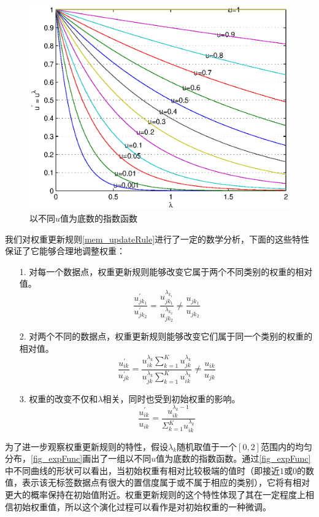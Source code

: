 \begin{figure}[h]
   \centering
   \includegraphics[width=4.5in]{figures/expfunc}
\caption{以不同\(u\)值为底数的指数函数}
\label{fig_expFunc}
\end{figure}


我们对权重更新规则\autoref{mem_updateRule}进行了一定的数学分析，下面的这些特性保证了它能够合理地调整权重：
\begin{enumerate}
\item[1.]对每一个数据点，权重更新规则能够改变它属于两个不同类别的权重的相对值。
\\ \[ \frac{u_{jk_{1}}^{'}}{u_{jk_{2}}^{'}}=\frac{u_{jk_{1}}^{\lambda_{k_{1}}}}{u_{jk_{2}}^{\lambda_{k_{2}}}} \neq \frac{u_{jk_{1}}}{u_{jk_{2}}} \]
%
\item[2.]对两个不同的数据点，权重更新规则能够改变它们属于同一个类别的权重的相对值。
\\ \[ \frac{u_{ik}^{'}}{u_{jk}^{'}}=\frac{u_{ik}^{\lambda_{k}} \sum_{k=1}^{K}u_{jk}^{\lambda_{k}}}{u_{jk}^{\lambda_{k}} \sum_{k=1}^{K}u_{ik}^{\lambda_{k}}} \neq \frac{u_{ik}}{u_{jk}} \]
%
\item[3.]权重的改变不仅和\(\lambda\)相关，同时也受到初始权重的影响。
\\ \[ \frac{u_{ik}^{'}}{u_{ik}}=\frac{u_{ik}^{\lambda_{k}-1}}{\Sigma_{k=1}^{K} u_{ik}^{\lambda_{k}}} \]
\end{enumerate}

为了进一步观察权重更新规则的特性，假设\(\lambda_{k}\)随机取值于一个\([0,2]\)范围内的均匀分布，\autoref{fig_expFunc}画出了一组以不同\(u\)值为底数的指数函数。通过\autoref{fig_expFunc}中不同曲线的形状可以看出，当初始权重有相对比较极端的值时（即接近\(1\)或\(0\)的数值，表示该无标签数据点有很大的置信度属于或不属于相应的类别），它将有相对更大的概率保持在初始值附近。权重更新规则的这个特性体现了其在一定程度上相信初始权重值，所以这个演化过程可以看作是对初始权重的一种微调。

